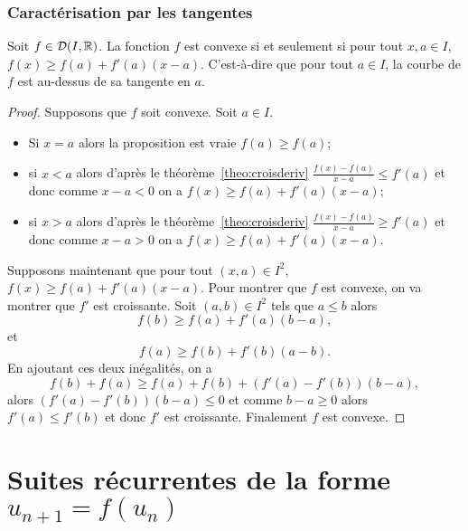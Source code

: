 \subsubsection{Caractérisation par les tangentes}

\begin{theo}
  Soit \(f \in \mathcal{D}(I,\mathbb{R})\). La fonction \(f\) est convexe si et seulement si
  pour tout \(x,a \in I\), \(f(x) \geqslant f(a)+f'(a)(x-a)\). C'est-à-dire que
  pour tout \(a \in I\), la courbe de \(f\) est au-dessus de sa tangente en
  \(a\).
\end{theo}
\begin{proof}
  Supposons que \(f\) soit convexe. Soit \(a \in I\).
  \begin{itemize}
    \item Si \(x=a\) alors la proposition est vraie \(f(a) \geqslant f(a)\);
    \item si \(x < a\) alors d'après le théorème~\ref{theo:croisderiv}
      \(\frac{f(x)-f(a)}{x-a} \leqslant f'(a)\) et donc
      comme \(x-a <0\) on a \(f(x) \geqslant f(a)+f'(a)(x-a)\);
    \item si \(x > a\) alors d'après le théorème~\ref{theo:croisderiv}
      \(\frac{f(x)-f(a)}{x-a} \geqslant f'(a)\) et donc
      comme \(x-a >0\) on a \(f(x) \geqslant f(a)+f'(a)(x-a)\).
  \end{itemize}

  Supposons maintenant que  pour tout \((x,a) \in I^2\), \(f(x) \geqslant
  f(a)+f'(a)(x-a)\). Pour montrer que \(f\) est convexe, on va montrer que
  \(f'\) est croissante. Soit \((a,b) \in I^2\) tels que \(a \leqslant b\) alors
  \begin{equation}
    f(b) \geqslant f(a)+f'(a)(b-a),
  \end{equation}
  et
  \begin{equation}
    f(a) \geqslant f(b)+f'(b)(a-b).
  \end{equation}
  En ajoutant ces deux inégalités, on a
  \begin{equation}
    f(b)+f(a) \geqslant f(a)+f(b) +(f'(a)-f'(b))(b-a),
  \end{equation}
  alors \((f'(a)-f'(b))(b-a) \leqslant 0\) et comme \(b-a \geqslant 0\) alors
  \(f'(a) \leqslant f'(b)\) et donc \(f'\) est croissante. Finalement \(f\) est
  convexe.
\end{proof}

\section{Suites récurrentes de la forme \(u_{n+1}=f(u_n)\)}

